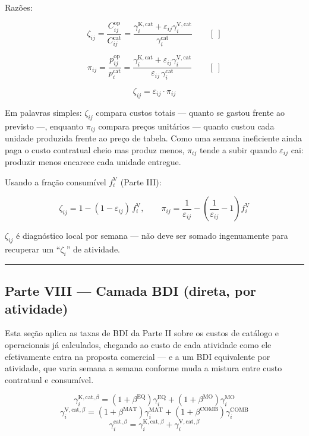 \documentclass[
  10pt,
]{article}
\begin{document}
Razões:

\[\zeta_{ij} = \frac{C_{ij}^{\mathrm{op}}}{C_{ij}^{\mathrm{cat}}} = \frac{\gamma_i^{\mathrm{K,cat}}+\varepsilon_{ij}\gamma_i^{\mathrm{V,cat}}}{\gamma_i^{\mathrm{cat}}}\qquad[\ ]\]

\[\pi_{ij} = \frac{p_{ij}^{\mathrm{op}}}{p_i^{\mathrm{cat}}} = \frac{\gamma_i^{\mathrm{K,cat}}+\varepsilon_{ij}\gamma_i^{\mathrm{V,cat}}}{\varepsilon_{ij}\,\gamma_i^{\mathrm{cat}}}\qquad[\ ]\]

\[\boxed{\zeta_{ij} = \varepsilon_{ij}\cdot\pi_{ij}}\]

Em palavras simples: \(\zeta_{ij}\) compara custos totais --- quanto se
gastou frente ao previsto ---, enquanto \(\pi_{ij}\) compara preços
unitários --- quanto custou cada unidade produzida frente ao preço de
tabela. Como uma semana ineficiente ainda paga o custo contratual cheio
mas produz menos, \(\pi_{ij}\) tende a subir quando \(\varepsilon_{ij}\)
cai: produzir menos encarece cada unidade entregue.

Usando a fração consumível \(f_i^{\mathrm V}\) (Parte III):

\[\zeta_{ij} = 1-(1-\varepsilon_{ij})\,f_i^{\mathrm V}, \qquad \pi_{ij} = \frac{1}{\varepsilon_{ij}}-\left(\frac{1}{\varepsilon_{ij}}-1\right)f_i^{\mathrm V}\]

\(\zeta_{ij}\) é diagnóstico local por semana --- não deve ser somado
ingenuamente para recuperar um ``\(\zeta_i\)'' de atividade.

\begin{center}\rule{0.5\linewidth}{0.5pt}\end{center}

\hypertarget{parte-viii-camada-bdi-direta-por-atividade}{%
\subsection{Parte VIII --- Camada BDI (direta, por
atividade)}\label{parte-viii-camada-bdi-direta-por-atividade}}

Esta seção aplica as taxas de BDI da Parte II sobre os custos de
catálogo e operacionais já calculados, chegando ao custo de cada
atividade como ele efetivamente entra na proposta comercial --- e a um
BDI equivalente por atividade, que varia semana a semana conforme muda a
mistura entre custo contratual e consumível.

\[\gamma_i^{\mathrm{K,cat},\beta} = (1+\beta^{\mathrm{EQ}})\gamma_i^{\mathrm{EQ}}+(1+\beta^{\mathrm{MO}})\gamma_i^{\mathrm{MO}}\]
\[\gamma_i^{\mathrm{V,cat},\beta} = (1+\beta^{\mathrm{MAT}})\gamma_i^{\mathrm{MAT}}+(1+\beta^{\mathrm{COMB}})\gamma_i^{\mathrm{COMB}}\]
\[\gamma_i^{\mathrm{cat},\beta} = \gamma_i^{\mathrm{K,cat},\beta}+\gamma_i^{\mathrm{V,cat},\beta}\]
\end{document}
